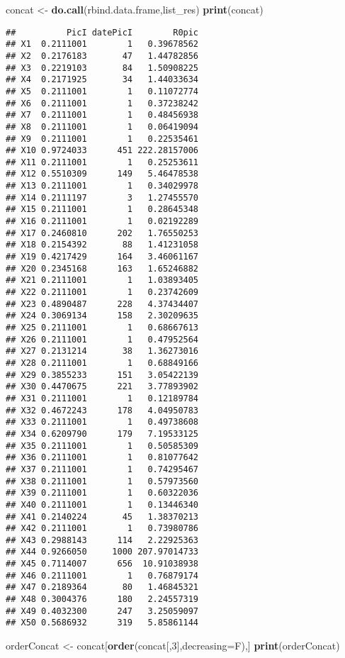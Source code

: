 \documentclass[
]{article}
\newenvironment{Shaded}{\begin{snugshade}}{\end{snugshade}}
\newcommand{\DataTypeTok}[1]{\textcolor[rgb]{0.13,0.29,0.53}{#1}}
\newcommand{\DecValTok}[1]{\textcolor[rgb]{0.00,0.00,0.81}{#1}}
\newcommand{\KeywordTok}[1]{\textcolor[rgb]{0.13,0.29,0.53}{\textbf{#1}}}
\newcommand{\NormalTok}[1]{#1}
\newcommand{\StringTok}[1]{\textcolor[rgb]{0.31,0.60,0.02}{#1}}
\begin{document}
\begin{Shaded}
\begin{Highlighting}[]
\NormalTok{concat <-}\StringTok{ }\KeywordTok{do.call}\NormalTok{(rbind.data.frame,list_res)}
\KeywordTok{print}\NormalTok{(concat)}
\end{Highlighting}
\end{Shaded}

\begin{verbatim}
##          PicI datePicI        R0pic
## X1  0.2111001        1   0.39678562
## X2  0.2176183       47   1.44782856
## X3  0.2219103       84   1.50908225
## X4  0.2171925       34   1.44033634
## X5  0.2111001        1   0.11072774
## X6  0.2111001        1   0.37238242
## X7  0.2111001        1   0.48456938
## X8  0.2111001        1   0.06419094
## X9  0.2111001        1   0.22535461
## X10 0.9724033      451 222.28157006
## X11 0.2111001        1   0.25253611
## X12 0.5510309      149   5.46478538
## X13 0.2111001        1   0.34029978
## X14 0.2111197        3   1.27455570
## X15 0.2111001        1   0.28645348
## X16 0.2111001        1   0.02192289
## X17 0.2460810      202   1.76550253
## X18 0.2154392       88   1.41231058
## X19 0.4217429      164   3.46061167
## X20 0.2345168      163   1.65246882
## X21 0.2111001        1   1.03893405
## X22 0.2111001        1   0.23742609
## X23 0.4890487      228   4.37434407
## X24 0.3069134      158   2.30209635
## X25 0.2111001        1   0.68667613
## X26 0.2111001        1   0.47952564
## X27 0.2131214       38   1.36273016
## X28 0.2111001        1   0.68849166
## X29 0.3855233      151   3.05422139
## X30 0.4470675      221   3.77893902
## X31 0.2111001        1   0.12189784
## X32 0.4672243      178   4.04950783
## X33 0.2111001        1   0.49738608
## X34 0.6209790      179   7.19533125
## X35 0.2111001        1   0.50585309
## X36 0.2111001        1   0.81077642
## X37 0.2111001        1   0.74295467
## X38 0.2111001        1   0.57973560
## X39 0.2111001        1   0.60322036
## X40 0.2111001        1   0.13446340
## X41 0.2140224       45   1.38370213
## X42 0.2111001        1   0.73980786
## X43 0.2988143      114   2.22925363
## X44 0.9266050     1000 207.97014733
## X45 0.7114007      656  10.91038938
## X46 0.2111001        1   0.76879174
## X47 0.2189364       80   1.46845321
## X48 0.3004376      180   2.24557319
## X49 0.4032300      247   3.25059097
## X50 0.5686932      319   5.85861144
\end{verbatim}

\begin{Shaded}
\begin{Highlighting}[]
\NormalTok{orderConcat <-}\StringTok{ }\NormalTok{concat[}\KeywordTok{order}\NormalTok{(concat[,}\DecValTok{3}\NormalTok{],}\DataTypeTok{decreasing=}\NormalTok{F),]}
\KeywordTok{print}\NormalTok{(orderConcat)}
\end{Highlighting}
\end{Shaded}
\end{document}
